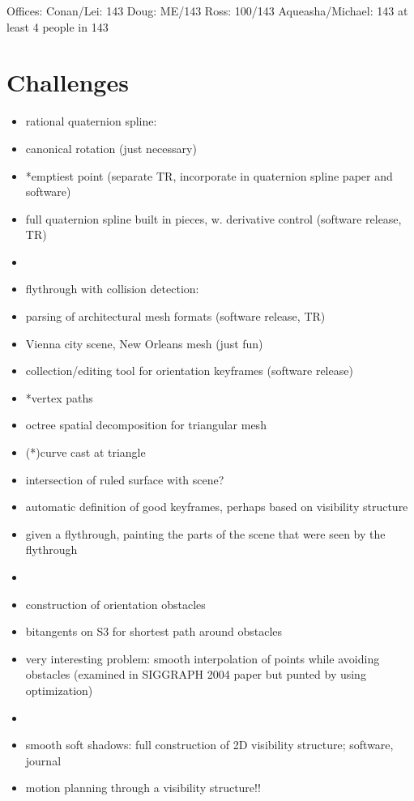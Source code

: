 \documentclass[12pt]{article}
\begin{document}
Offices:
Conan/Lei: 143
Doug: ME/143
Ross: 100/143
Aqueasha/Michael: 143
at least 4 people in 143

\clearpage

\section{Challenges}

\begin{itemize}
\item rational quaternion spline:
\item canonical rotation (just necessary)
\item *emptiest point (separate TR, incorporate in quaternion spline paper and software)
\item full quaternion spline built in pieces, w. derivative control (software release, TR)
\item 
\item flythrough with collision detection:
\item parsing of architectural mesh formats (software release, TR)
\item Vienna city scene, New Orleans mesh (just fun)
\item collection/editing tool for orientation keyframes (software release)
\item *vertex paths
\item octree spatial decomposition for triangular mesh
\item (*)curve cast at triangle
\item intersection of ruled surface with scene?
\item automatic definition of good keyframes, perhaps based on visibility structure
\item given a flythrough, painting the parts of the scene that were seen by the flythrough
\item 
\item construction of orientation obstacles
\item bitangents on S3 for shortest path around obstacles
\item very interesting problem: smooth interpolation of points while avoiding obstacles
      (examined in SIGGRAPH 2004 paper but punted by using optimization)
\item 
\item smooth soft shadows: full construction of 2D visibility structure; software, journal
\item motion planning through a visibility structure!!
\end{itemize}
\end{document}

